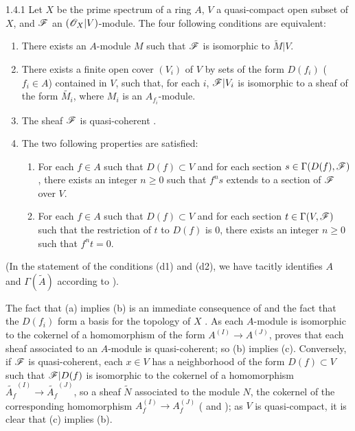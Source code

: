 \begin{envs}[Theorem]{1.4.1}
\label{thm-1.1.4.1}
Let $X$ be the prime spectrum of a ring $A$, $V$ a quasi-compact open subset of $X$, and
$\mathscr{F}$ an $(\mathscr{O}_X|V)$-module. The four following conditions are equivalent:
\begin{enumerate}[label=\rm{(\alph*)}]
  \item There exists an $A$-module $M$ such that $\mathscr{F}$ is isomorphic to
        $\widetilde{M}|V$.
  \item There exists a finite open cover $(V_i)$ of $V$ by sets of the form $D(f_i)$
        ($f_i\in A$) contained in $V$, such that, for each $i$, $\mathscr{F}|V_i$ is isomorphic to
        a sheaf of the form $\widetilde{M_i}$, where $M_i$ is an $A_{f_i}$-module.
  \item The sheaf $\mathscr{F}$ is quasi-coherent .
  \item The two following properties are satisfied:
        \begin{enumerate}[label=\rm{(d\arabic*)}]
          \item For each $f\in A$ such that $D(f)\subset V$ and for each section
                $s\in\Gamma(D(f),\mathscr{F})$, there exists an integer $n\geqslant 0$ such that
                $f^n s$ extends to a section of $\mathscr{F}$ over $V$.
          \item For each $f\in A$ such that $D(f)\subset V$ and for each section
                $t\in\Gamma(V,\mathscr{F})$ such that the restriction of $t$ to $D(f)$ is $0$,
                there exists an integer $n\geqslant 0$ such that $f^n t=0$.
        \end{enumerate}
\end{enumerate}
\end{envs}
(In the statement of the conditions (d1) and (d2), we have tacitly identifies $A$ and
$\Gamma(\widetilde{A})$ according to ).

The fact that (a) implies (b) is an immediate consequence of  and the fact
that the $D(f_i)$ form a basis for the topology of $X$ . As each
$A$-module is isomorphic to the cokernel of a homomorphism of the form $A^{(I)}\to A^{(J)}$,
 proves that each sheaf associated to an $A$-module is quasi-coherent; so
(b) implies (c). Conversely, if $\mathscr{F}$ is quasi-coherent, each $x\in V$ has a neighborhood
of the form $D(f)\subset V$ such that $\mathscr{F}|D(f)$ is isomorphic to the cokernel of a
homomorphism $\widetilde{A_f}^{(I)}\to\widetilde{A_f}^{(J)}$, so a sheaf $\widetilde{N}$
associated to the module $N$, the cokernel of the corresponding homomorphism
$A_f^{(I)}\to A_f^{(J)}$ ( and ); as $V$ is quasi-compact,
it is clear that (c) implies (b).

